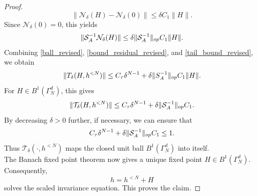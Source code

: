 \documentclass[10pt,a4paper]{amsart}
\begin{document}
\begin{proof}
\begin{equation}
        \|\mathcal N_\delta(H)-\mathcal N_\delta(0)\|
        \le
        \delta C_1\|H\|.
\end{equation}
Since $\mathcal N_\delta(0)=0$, this yields
\begin{equation}\label{tail_bound_revised}
        \|\mathcal S_A^{-1}\mathcal N_\delta(H)\|
        \le
        \delta
        \|\mathcal S_A^{-1}\|_{\rm op}
        C_1
        \|H\|.
\end{equation}
Combining \eqref{ball_revised}, \eqref{bound_residual_revised}, and
\eqref{tail_bound_revised}, we obtain
\begin{equation}
    \|T_\delta(H,h^{<N})\|
    \leq
    C_\tau\delta^{N-1}
    +
    \delta\|S_A^{-1}\|_{\rm op}C_1\|H\|.
\end{equation}
For $H\in B^1(\Gamma_N^d)$, this gives
\begin{equation}
        \|\mathcal T_\delta(H,h^{<N})\|
        \le
        C_{\tau}\delta^{N-1}
        +
        \delta
        \|\mathcal S_A^{-1}\|_{\rm op}
        C_1 .
\end{equation}
By decreasing $\delta>0$ further, if necessary, we can ensure that
\begin{equation}
        C_{\tau}\delta^{N-1}
        +
        \delta
        \|\mathcal S_A^{-1}\|_{\rm op}
        C_1
        \leq 1.
\end{equation}
Thus $\mathcal T_\delta(\cdot,h^{<N})$ maps the closed unit ball
$B^1(\Gamma_N^d)$ into itself.\\
The Banach fixed point theorem now gives a unique fixed point
$H\in B^1(\Gamma_N^d)$. Consequently,
\begin{equation}
        h=h^{<N}+H
\end{equation}
solves the scaled invariance equation. This proves the claim.
\end{proof}
\end{document}
